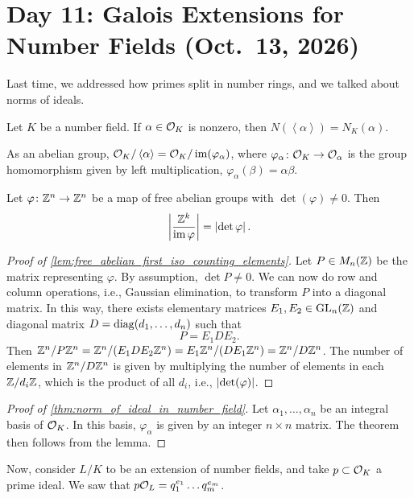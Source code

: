 \section{Day 11: Galois Extensions for Number Fields (Oct.\ 13, 2026)}
Last time, we addressed how primes split in number rings, and we talked about norms of ideals.
\begin{theorem} \label{thm:norm_of_ideal_in_number_field}
    Let $K$ be a number field. If $\alpha \in \mathcal O_K$ is nonzero, then $N(\left<\alpha\right>) = N_K(\alpha)$.
\end{theorem}

As an abelian group, $\mathcal O_K/\left<\alpha\right> = \mathcal O_K/\operatorname{im}(\varphi_\alpha)$, where $\varphi_\alpha \colon \mathcal O_K \to \mathcal O_\alpha$ is the group homomorphism given by left multiplication, $\varphi_\alpha(\beta) = \alpha \beta$.

\begin{lemma} \label{lem:free_abelian_first_iso_counting_elements}
    Let $\varphi \colon \mathbb Z^n \to \mathbb Z^n$ be a map of free abelian groups with $\det(\varphi) \neq 0$. Then
    \[ \left\lvert \frac{\mathbb Z^k}{\operatorname{im} \varphi} \right\rvert = \left\lvert \det \varphi \right\rvert. \]
\end{lemma} \vspace{-8pt}

\begin{proof}[Proof of \ref{lem:free_abelian_first_iso_counting_elements}]
    Let $P \in M_n(\mathbb Z)$ be the matrix representing $\varphi$. By assumption, $\det P \neq 0$. We can now do row and column operations, i.e., Gaussian elimination, to transform $P$ into a diagonal matrix. In this way, there exists elementary matrices $E_1, E_2 \in \operatorname{GL}_n(\mathbb Z)$ and diagonal matrix $D = \operatorname{diag}(d_1, \dots, d_n)$ such that
    \[ P = E_1 D E_2. \]
    Then $\mathbb Z^n / P \mathbb Z^n = \mathbb Z^n / (E_1 D E_2 \mathbb Z^n) = E_1 \mathbb Z^n / (D E_1 \mathbb Z^n) = \mathbb Z^n / D \mathbb Z^n$. The number of elements in $\mathbb Z^n / D \mathbb Z^n$ is given by multiplying the number of elements in each $\mathbb Z / d_i \mathbb Z$, which is the product of all $d_i$, i.e., $
    \left\lvert \det(\varphi) \right\rvert$.
\end{proof}

\begin{proof}[Proof of \ref{thm:norm_of_ideal_in_number_field}]
    Let $\alpha_1, \dots, \alpha_n$ be an integral basis of $\mathcal O_K$. In this basis, $\varphi_\alpha$ is given by an integer $n \times n$ matrix. The theorem then follows from the lemma.
\end{proof}

Now, consider $L/K$ to be an extension of number fields, and take $p \subset \mathcal O_K$ a prime ideal. We saw that $p \mathcal O_L = q_1^{e_1} \dots q_m^{e_m}$.

